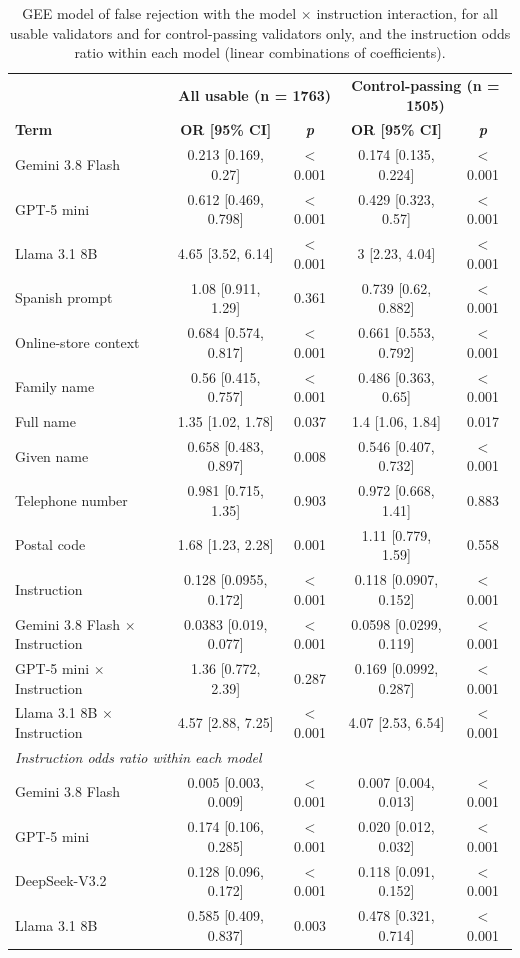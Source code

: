 \begin{table}[H]
\caption{GEE model of false rejection with the model $\times$ instruction interaction, for all usable validators and for control-passing validators only, and the instruction odds ratio within each model (linear combinations of coefficients).\label{tab:interaction}}
\begin{tabularx}{\textwidth}{Xcccc}
\toprule
& \multicolumn{2}{c}{\textbf{All usable (n = 1763)}} & \multicolumn{2}{c}{\textbf{Control-passing (n = 1505)}}\\
\textbf{Term} & \textbf{OR [95\% CI]} & \textbf{\emph{p}} & \textbf{OR [95\% CI]} & \textbf{\emph{p}}\\
\midrule
Gemini 3.8 Flash & 0.213 [0.169, 0.27] & $<$0.001 & 0.174 [0.135, 0.224] & $<$0.001\\
GPT-5 mini & 0.612 [0.469, 0.798] & $<$0.001 & 0.429 [0.323, 0.57] & $<$0.001\\
Llama 3.1 8B & 4.65 [3.52, 6.14] & $<$0.001 & 3 [2.23, 4.04] & $<$0.001\\
Spanish prompt & 1.08 [0.911, 1.29] & 0.361 & 0.739 [0.62, 0.882] & $<$0.001\\
Online-store context & 0.684 [0.574, 0.817] & $<$0.001 & 0.661 [0.553, 0.792] & $<$0.001\\
Family name & 0.56 [0.415, 0.757] & $<$0.001 & 0.486 [0.363, 0.65] & $<$0.001\\
Full name & 1.35 [1.02, 1.78] & 0.037 & 1.4 [1.06, 1.84] & 0.017\\
Given name & 0.658 [0.483, 0.897] & 0.008 & 0.546 [0.407, 0.732] & $<$0.001\\
Telephone number & 0.981 [0.715, 1.35] & 0.903 & 0.972 [0.668, 1.41] & 0.883\\
Postal code & 1.68 [1.23, 2.28] & 0.001 & 1.11 [0.779, 1.59] & 0.558\\
Instruction & 0.128 [0.0955, 0.172] & $<$0.001 & 0.118 [0.0907, 0.152] & $<$0.001\\
Gemini 3.8 Flash $\times$ Instruction & 0.0383 [0.019, 0.077] & $<$0.001 & 0.0598 [0.0299, 0.119] & $<$0.001\\
GPT-5 mini $\times$ Instruction & 1.36 [0.772, 2.39] & 0.287 & 0.169 [0.0992, 0.287] & $<$0.001\\
Llama 3.1 8B $\times$ Instruction & 4.57 [2.88, 7.25] & $<$0.001 & 4.07 [2.53, 6.54] & $<$0.001\\
\midrule
\multicolumn{5}{l}{\textit{Instruction odds ratio within each model}}\\
Gemini 3.8 Flash & 0.005 [0.003, 0.009] & $<$0.001 & 0.007 [0.004, 0.013] & $<$0.001\\
GPT-5 mini & 0.174 [0.106, 0.285] & $<$0.001 & 0.020 [0.012, 0.032] & $<$0.001\\
DeepSeek-V3.2 & 0.128 [0.096, 0.172] & $<$0.001 & 0.118 [0.091, 0.152] & $<$0.001\\
Llama 3.1 8B & 0.585 [0.409, 0.837] & 0.003 & 0.478 [0.321, 0.714] & $<$0.001\\
\bottomrule
\end{tabularx}
\end{table}

